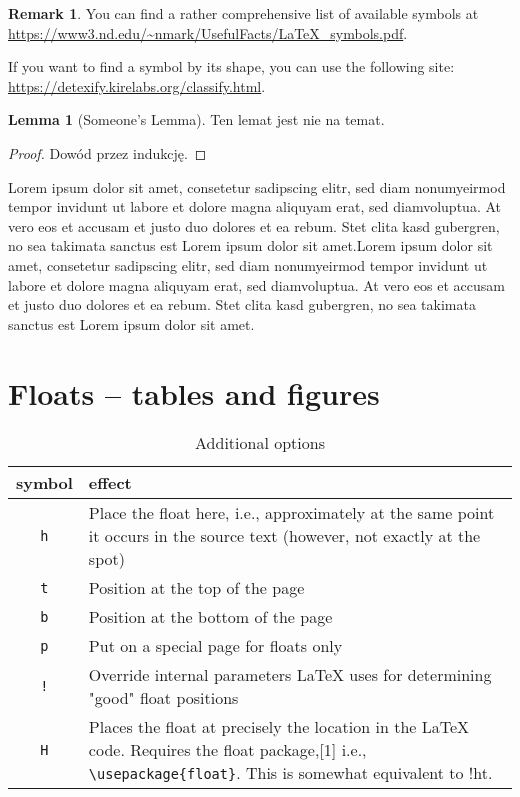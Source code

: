 \documentclass[a4paper,11pt,twoside]{report}
\theoremstyle{definition}
\newtheorem{lemma}[theorem]{Lemma}
\newtheorem{remark}[theorem]{Remark}
\begin{document}
\begin{remark}
	You can find a rather comprehensive list of available symbols at \url{https://www3.nd.edu/~nmark/UsefulFacts/LaTeX_symbols.pdf}.
	
	If you want to find a symbol by its shape, you can use the following site: \url{https://detexify.kirelabs.org/classify.html}. 
\end{remark}

\begin{lemma}[Someone's Lemma]
	Ten lemat jest nie na temat.
\end{lemma}
\begin{proof} Dowód przez indukcję.
\end{proof}


Lorem ipsum dolor sit amet, consetetur sadipscing elitr, sed diam nonumyeirmod tempor invidunt ut labore et dolore magna aliquyam erat, sed diamvoluptua. At vero eos et accusam et justo duo dolores et ea rebum. Stet clita kasd gubergren, no sea takimata sanctus est Lorem ipsum dolor sit amet.Lorem ipsum dolor sit amet, consetetur sadipscing elitr, sed diam nonumyeirmod tempor invidunt ut labore et dolore magna aliquyam erat, sed diamvoluptua. At vero eos et accusam et justo duo dolores et ea rebum. Stet clita kasd gubergren, no sea takimata sanctus est Lorem ipsum dolor sit amet.



\section{Floats -- tables and figures}

\begin{table}%
\caption[Short caption]{Additional options}
\label{opcje}
\centering
\begin{tabular}{|c|p{}|}
\hline
symbol & effect \\ \hline
\texttt{h} & Place the float here, i.e., approximately at the same point it occurs in the source text (however, not exactly at the spot) \\
\texttt{t} & Position at the top of the page \\
\texttt{b} & Position at the bottom of the page \\
\texttt{p} & Put on a special page for floats only \\
\texttt{!} & Override internal parameters LaTeX uses for determining "good" float positions \\ 
\texttt{H} & Places the float at precisely the location in the \LaTeX ~ code. Requires the float package,[1] i.e., \texttt{\textbackslash usepackage\{float\}}. This is somewhat equivalent to !ht.\\ \hline
\end{tabular}
\end{table}
\end{document}
